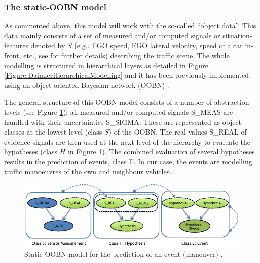 \subsubsection*{The static-OOBN model}

As commented above, this model will work with the so-called ``object data''. This data mainly consists of a set of measured and/or computed signals or situation-features denoted by $S$ (e.g.. EGO speed, EGO lateral velocity, speed of a car in-front, etc., see \cite{kasper2012object} for further details) describing the traffic scene. The whole modelling is structured in hierarchical layers as detailed in Figure \ref{Figure:DaimlerHierarchicalModelling} and it has been previously implemented \cite{kasper2012object} using an object-oriented Bayesian network (OOBN) \cite{koller1997object}. 




The general structure of this OOBN model consists of a number of abstraction levels (see Figure \ref{Figure:DaimlerOOBNAbstraction}): all measured and/or computed signals S\_MEAS are handled with their uncertainties S\_SIGMA. These are represented as object classes at the lowest level (class $S$) of the OOBN. The real values S\_REAL of evidence signals are then used at the next level of the hierarchy to evaluate the hypotheses (class $H$ in Figure \ref{Figure:DaimlerOOBNAbstraction}). The combined evaluation of several hypotheses results in the prediction of events, class E. In our case, the events are modelling traffic manoeuvres of the own and neighbour vehicles.

\begin{figure}
\begin{center}
\includegraphics[scale=0.58]{./figures/DaimlerOOBNAbstraction}
\caption{\label{Figure:DaimlerOOBNAbstraction} Static-OOBN model for the prediction of an event (maneuver) \cite{Weidl2014}.}
\end{center}
\end{figure}

